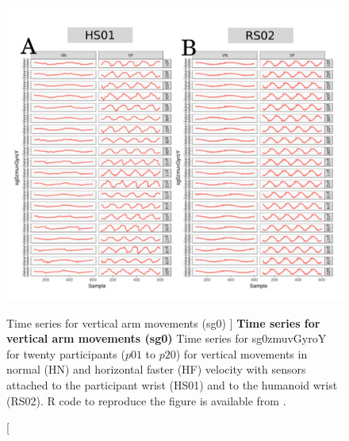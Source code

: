 \begin{figure}
\centering
\includegraphics[width=1.0\textwidth]{aV-sg0}
    	\caption
	[Time series for vertical arm movements (sg0) ]{
	{\bf Time series for vertical arm movements (sg0)}
		Time series for sg0zmuvGyroY for twenty participants 
		($p01$ to  $p20$) 
		for vertical movements in normal (HN) and horizontal faster (HF) 
		velocity with sensors attached to the participant wrist (HS01)
		and to the humanoid wrist (RS02).
	R code to reproduce the figure is available from \cite{xochicale2018}.
        }
    \label{fig:aV-sg0}
\end{figure}

